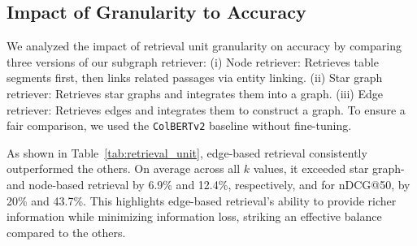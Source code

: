 \vspace{-1mm}
\subsection{Impact of Granularity to Accuracy}
\label{sec:exp_granularity_analysis}
\vspace{-1mm}


\begin{table}[t]
    \centering
    \setlength{\tabcolsep}{2pt} %
    \vspace{-3mm}
    \caption{
        Retrieval accuracy across different units
    }
    \label{tab:retrieval_unit} 
\end{table}


We analyzed the impact of retrieval unit granularity on accuracy by comparing three versions of our subgraph retriever:
(i) Node retriever: Retrieves table segments first, then links related passages via entity linking.
(ii) Star graph retriever: Retrieves star graphs and integrates them into a graph.
(iii) Edge retriever: Retrieves edges and integrates them to construct a graph.
To ensure a fair comparison, we used the \texttt{ColBERTv2} baseline without fine-tuning.

As shown in Table~\ref{tab:retrieval_unit}, edge-based retrieval consistently outperformed the others. On average across all $k$ values, it exceeded star graph- and node-based retrieval by 6.9\% and 12.4\%, respectively, and for nDCG@50, by 20\% and 43.7\%. 
This highlights edge-based retrieval's ability to provide richer information while minimizing information loss, striking an effective balance compared to the others.

